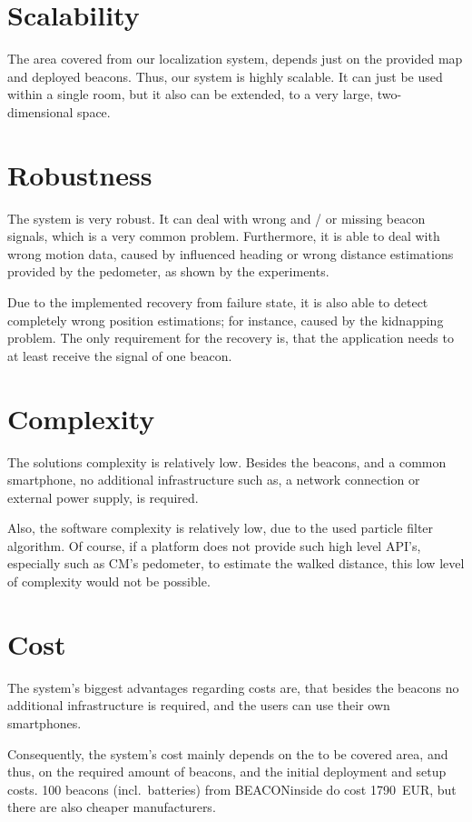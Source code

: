 \section{Scalability}
The area covered from our localization system, depends just on the provided map and deployed beacons. Thus, our system is highly scalable. It can just be used within a single room, but it also can be extended, to a very large, two-dimensional space.

\section{Robustness}
The system is very robust. It can deal with wrong and / or missing beacon signals, which is a very common problem. Furthermore, it is able to deal with wrong motion data, caused by influenced heading or wrong distance estimations provided by the pedometer, as shown by the experiments.

Due to the implemented recovery from failure state, it is also able to detect completely wrong position estimations; for instance, caused by the kidnapping problem. The only requirement for the recovery is, that the application needs to at least receive the signal of one beacon.

\section{Complexity}
The solutions complexity is relatively low. Besides the beacons, and a common smartphone, no additional infrastructure such as, a network connection or external power supply, is required.
	
Also, the software complexity is relatively low, due to the used particle filter algorithm. Of course, if a platform does not provide such high level \acs{API}'s, especially such as \acl{CM}'s pedometer, to estimate the walked distance, this low level of complexity would not be possible.

\section{Cost}
The system's biggest advantages regarding costs are, that besides the beacons no additional infrastructure is required, and the users can use their own smartphones.

Consequently, the system's cost mainly depends on the to be covered area, and thus, on the required amount of beacons, and the initial deployment and setup costs. 100 beacons (incl.\ batteries) from BEACONinside do cost 1790~EUR, but there are also cheaper manufacturers.

